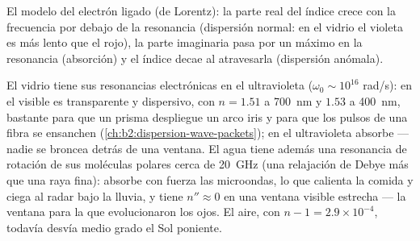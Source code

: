 \begin{omfigure}

{\small El modelo del electrón ligado (de Lorentz): la parte real del
índice crece con la frecuencia por debajo de la resonancia (dispersión
normal: en el vidrio el violeta es más lento que el rojo), la parte
imaginaria pasa por un máximo en la resonancia (absorción) y el índice
decae al atravesarla (dispersión anómala).}
\end{omfigure}

\begin{example}\label{ex:b2:waves-in-media:dielectrics}
El vidrio tiene sus resonancias electrónicas en el ultravioleta ($\omega_0 \sim 10^{16}$
rad/s): en el visible es transparente y dispersivo, con $n = 1.51$ a
\qty{700}{nm} y $1.53$ a \qty{400}{nm}, bastante para que un prisma despliegue
un arco iris y para que los pulsos de una fibra se ensanchen (\cref{ch:b2:dispersion-wave-packets});
en el ultravioleta absorbe --- nadie se broncea detrás de una ventana.
El agua tiene además una resonancia de rotación de sus moléculas polares
cerca de \qty{20}{GHz} (una relajación de Debye más que una raya fina):
absorbe con fuerza las microondas, lo que calienta la comida y ciega al
radar bajo la lluvia, y tiene $n'' \approx 0$ en una ventana visible estrecha
--- la ventana para la que evolucionaron los ojos. El aire, con $n - 1 = 2.9 \times 10^{-4}$,
todavía desvía medio grado el Sol poniente.
\end{example}

